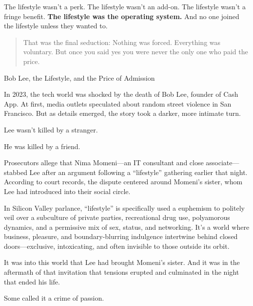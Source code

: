 The lifestyle wasn’t a perk.
The lifestyle wasn’t an add-on.
The lifestyle wasn’t a fringe benefit.
\textbf{The lifestyle was the operating system.}
And no one joined the lifestyle unless they wanted to.

\begin{quote}
That was the final seduction:  
Nothing was forced.  
Everything was voluntary.  
But once you said yes  
you were never the only one who paid the price.
\end{quote}


\begin{HistoricalSidebar}{Bob Lee, the Lifestyle, and the Price of Admission}

  In 2023, the tech world was shocked by the death of Bob Lee, founder of Cash App.  
  At first, media outlets speculated about random street violence in San Francisco.  
  But as details emerged, the story took a darker, more intimate turn.
  
  \medskip
  
  Lee wasn’t killed by a stranger.
  
  \medskip
  
  He was killed by a friend.
  
  \medskip
  
  Prosecutors allege that Nima Momeni—an IT consultant and close associate—stabbed Lee after an argument following 
  a “lifestyle” gathering earlier that night. According to court records, the dispute centered around Momeni’s sister, 
  whom Lee had introduced into their social circle.
  
  \medskip
  
  In Silicon Valley parlance, “lifestyle” is specifically used a euphemism to politely veil over a subculture of private parties, 
  recreational drug use, polyamorous dynamics, and a permissive mix of sex, status, and networking. It’s a world where 
  business, pleasure, and boundary-blurring indulgence intertwine behind closed doors—exclusive, intoxicating, and 
  often invisible to those outside its orbit.
  
  \medskip
  
  It was into this world that Lee had brought Momeni’s sister. And it was in the aftermath of that invitation that 
  tensions erupted and culminated in the night that ended his life.

  \medskip
  
  Some called it a crime of passion.

  \medskip
  

\end{HistoricalSidebar}
